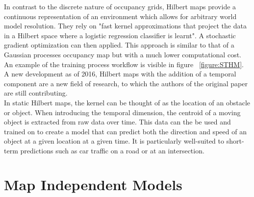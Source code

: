   In contrast to the discrete nature of occupancy grids, Hilbert maps provide a
  continuous representation of an environment which allows for arbitrary world
  model resolution. They rely on "fast kernel approximations that project the
  data in a Hilbert space where a logistic regression classifier is learnt".
  A stochastic gradient optimization can then applied. This approach is similar to
  that of a Gaussian processes occupancy map but with a much lower computational
  cost. An example
  of the training process workflow is visible in figure ~\ref{figure:STHM}.
  A new development as of 2016, Hilbert maps with the addition of a temporal
  component are a new field of research, to which the authors of
  the original paper are still contributing. \cite{Ramos2016, Senanayake2016} \\

  In static Hilbert maps, the kernel can be thought of as the location of an
  obstacle or object. When introducing the temporal dimension, the centroid of a
  moving object is extracted from raw data over time. This data can the be used
  and trained on to create a model that can predict both the direction and speed of an
  object at a given location at a given time. It is particularly well-suited to
  short-term predictions such as car traffic on a road or at an intersection.
  \cite{Senanayake2016} \cite{Senanayake2017}

  \section{ Map Independent Models }

